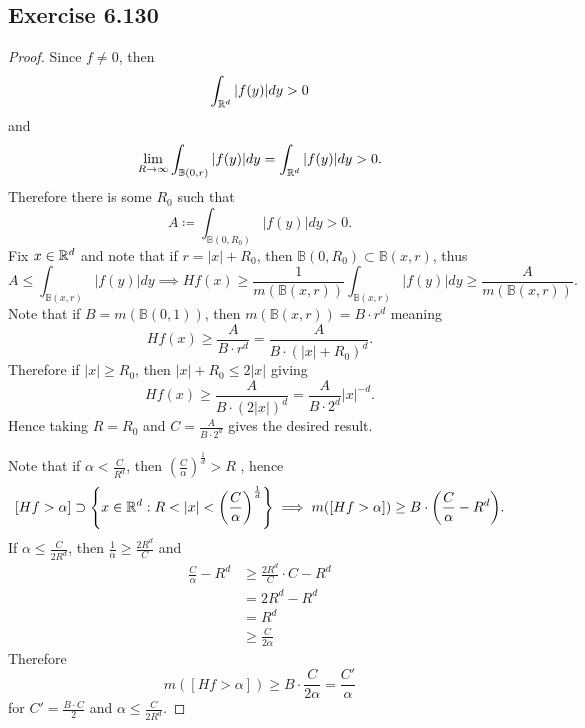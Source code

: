 \documentclass[hw_all.tex]{subfiles}
\begin{document}
\subsection{Exercise 6.130}
\begin{proof}
    Since $f \neq 0$, then
    \[
        \int_{\mathbb{R}^d} |f(y)| dy > 0
    \]
    and
    \[
        \lim_{R \to \infty} \int_{\mathbb{B}(0,r)} |f(y)| dy = \int_{\mathbb{R}^d} |f(y)| dy > 0
    .\]
    Therefore there is some $R_0$ such that 
    \[
        A \coloneq \int_{\mathbb{B}(0, R_0)} |f(y)| dy > 0
    .\]
    Fix $x \in \mathbb{R}^d$ and note that if $r = |x| + R_0$, then $\mathbb{B}(0, R_0) \subset \mathbb{B}(x, r)$, thus
    \[
        A \leq \int_{\mathbb{B}(x,r)} |f(y)| dy \implies H f(x) \geq \frac{1}{m(\mathbb{B}(x,r))} \int_{\mathbb{B}(x,r)} |f(y)| dy \geq \frac{A}{m(\mathbb{B}(x, r))}
    .\]
    Note that if $B = m(\mathbb{B}(0, 1))$, then $m(\mathbb{B}(x, r)) = B \cdot r^d$ meaning
    \[
        H f(x) \geq \frac{A}{B \cdot r^d} = \frac{A}{B \cdot (|x| + R_0)^d}
    .\]
    Therefore if $|x| \geq R_0$, then $|x| + R_0 \leq 2 |x|$ giving
    \[
        H f(x) \geq \frac{A}{B \cdot (2|x|)^d} = \frac{A}{B \cdot 2^d} |x|^{-d}
    .\]
    Hence taking $R = R_0$ and $C = \frac{A}{B \cdot 2^d}$ gives the desired result.

    Note that if $\alpha < \frac{C}{R^d}$, then $(\frac{C}{\alpha})^{\frac{1}{d}} > R$ , hence
    \[
        [Hf > \alpha] \supset \qty{x \in \mathbb{R}^d : R < |x| < \qty(\frac{C}{\alpha})^{\frac{1}{d}}} \implies m([Hf > \alpha]) \geq B \cdot \qty(\frac{C}{\alpha} - R^d)
    .\]
    If $\alpha \leq \frac{C}{2 R^d}$, then $\frac{1}{\alpha} \geq \frac{2 R^d}{C}$ and
    \begin{align*}
        \frac{C}{\alpha} - R^d &\geq \frac{2R^d}{C} \cdot C - R^d \\
        &= 2R^d - R^d \\
        &= R^d \\
        &\geq \frac{C}{2 \alpha}
    \end{align*}
    Therefore
    \[
        m([Hf > \alpha]) \geq B \cdot \frac{C}{2 \alpha} = \frac{C'}{\alpha}
    \]
    for $C' = \frac{B \cdot C}{2}$ and $\alpha \leq \frac{C}{2 R^d}$.
\end{proof}
\end{document}

